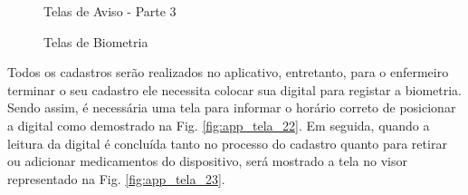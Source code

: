 \begin{apendicesenv}
\begin{figure}[H]
    \centering
    \caption{Telas de Aviso - Parte 3}\label{fig:telas_18_8}
\end{figure}


\begin{figure}[H]
    \centering
    \caption{Telas de Biometria}\label{fig:telas_22_23}
\end{figure}
Todos os cadastros serão realizados no aplicativo, entretanto, para o enfermeiro terminar o seu cadastro ele necessita colocar sua digital para registar a biometria. Sendo assim, é necessária uma tela para informar o horário correto de posicionar a digital como demostrado na Fig. \ref{fig:app_tela_22}. Em seguida, quando a leitura da digital é concluída tanto no processo do cadastro quanto para retirar ou adicionar medicamentos do dispositivo, será mostrado a tela no visor representado na Fig. \ref{fig:app_tela_23}.



\end{apendicesenv}
